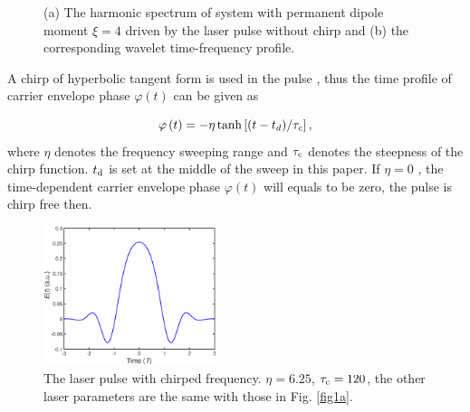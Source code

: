 \documentclass[10pt,letterpaper]{article}
\begin{document}
\begin{figure}[!htbp]
	\centering
	\caption{(a) The harmonic spectrum of system with permanent dipole moment $ \xi=4 $ driven by the laser pulse without chirp and (b) the corresponding wavelet time-frequency profile.}
	\label{fig2}
\end{figure}

A chirp of hyperbolic tangent form is used in the pulse \cite{Carrera-Chirp-PRA-2007}, thus the time profile of carrier envelope phase $ \varphi(t) $  can be given as

\begin{equation}
\varphi \left( t \right) =  - \eta \tanh \left[ {{{\left( {t - {t_d}} \right)} \mathord{\left/
			{\vphantom {{\left( {t - {t_d}} \right)} {{\tau _c}}}} \right.
			\kern-\nulldelimiterspace} {{\tau _c}}}} \right],
\label{eq19}
\end{equation}
where $ \eta $  denotes the frequency sweeping range and $ \tau_{\rm{c}} $ denotes the steepness of the chirp function. $ t_{\rm{d}} $ is set at the middle of the sweep in this paper. If $ \eta=0 $ , the time-dependent carrier envelope phase $ \varphi(t) $  will equals to be zero, the pulse is chirp free then.

\begin{figure}[htb]
	\centering
	\includegraphics[width=0.45\textwidth]{fig3}
	\caption{The laser pulse with chirped frequency. $ \eta=6.25 $, $ \tau_{\rm{c}}=120 $, the other laser parameters are the same with those in Fig. \ref{fig1a}.}
	\label{fig3}
\end{figure}
\end{document}
